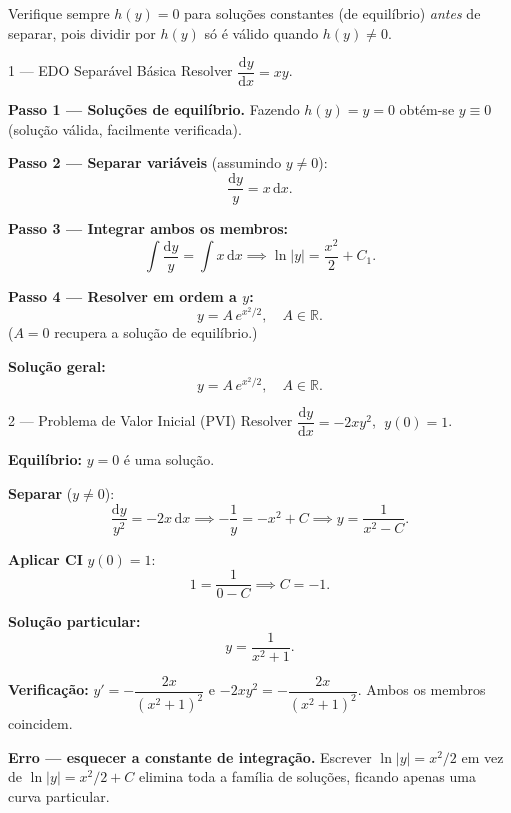 \documentclass[12pt, a4paper]{article}
\newcommand{\R}{\mathbb{R}}
\newcommand{\dd}{\mathrm{d}}
\begin{document}
\begin{tipbox}
  Verifique sempre $h(y)=0$ para soluções constantes (de equilíbrio) \emph{antes} de
  separar, pois dividir por $h(y)$ só é válido quando $h(y)\neq 0$.
\end{tipbox}

\begin{exbox}{1 --- EDO Separável Básica}
  Resolver $\dfrac{\dd y}{\dd x} = xy$.
\end{exbox}

\begin{solbox}
  \textbf{Passo 1 --- Soluções de equilíbrio.} Fazendo $h(y)=y=0$ obtém-se $y\equiv 0$
  (solução válida, facilmente verificada).

  \textbf{Passo 2 --- Separar variáveis} (assumindo $y\neq 0$):
  \[
    \frac{\dd y}{y} = x\,\dd x.
  \]

  \textbf{Passo 3 --- Integrar ambos os membros:}
  \[
    \int \frac{\dd y}{y} = \int x\,\dd x
    \implies \ln|y| = \frac{x^2}{2} + C_1.
  \]

  \textbf{Passo 4 --- Resolver em ordem a $y$:}
  \[
    y = A\,e^{x^2/2}, \quad A\in\R.
  \]
  ($A=0$ recupera a solução de equilíbrio.)

  \textbf{Solução geral:}
  \[
    \boxed{y = A\,e^{x^2/2}, \quad A\in\R.}
  \]
\end{solbox}

\begin{exbox}{2 --- Problema de Valor Inicial (PVI)}
  Resolver $\dfrac{\dd y}{\dd x} = -2xy^2$, $\;y(0) = 1$.
\end{exbox}

\begin{solbox}
  \textbf{Equilíbrio:} $y=0$ é uma solução.

  \textbf{Separar} ($y\neq 0$):
  \[
    \frac{\dd y}{y^2} = -2x\,\dd x
    \implies -\frac{1}{y} = -x^2 + C
    \implies y = \frac{1}{x^2 - C}.
  \]

  \textbf{Aplicar CI} $y(0)=1$:
  \[
    1 = \frac{1}{0 - C} \implies C = -1.
  \]

  \textbf{Solução particular:}
  \[
    \boxed{y = \frac{1}{x^2+1}.}
  \]

  \textbf{Verificação:}
  $y' = -\dfrac{2x}{(x^2+1)^2}$ e $-2xy^2 = -\dfrac{2x}{(x^2+1)^2}$.
  Ambos os membros coincidem. \checkmark
\end{solbox}

\begin{warnbox}
  \textbf{Erro --- esquecer a constante de integração.} Escrever
  $\ln|y| = x^2/2$ em vez de $\ln|y| = x^2/2 + C$ elimina toda a família de
  soluções, ficando apenas uma curva particular.
\end{warnbox}
\end{document}
